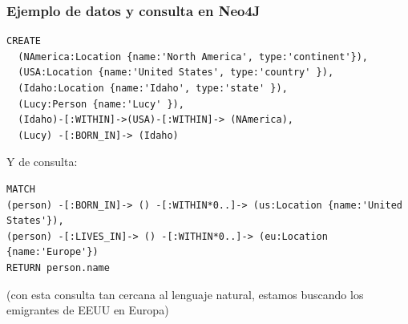 \documentclass[14pt]{beamer}
\begin{document}




\begin{frame}
  \frametitle{Ejemplo de datos y consulta en Neo4J}
\begin{block}{}
\begin{lstlisting}
CREATE
  (NAmerica:Location {name:'North America', type:'continent'}),
  (USA:Location {name:'United States', type:'country' }),
  (Idaho:Location {name:'Idaho', type:'state' }),
  (Lucy:Person {name:'Lucy' }),
  (Idaho)-[:WITHIN]->(USA)-[:WITHIN]-> (NAmerica),
  (Lucy) -[:BORN_IN]-> (Idaho)
\end{lstlisting}
\end{block}

\framebreak

Y de consulta:
\begin{block}{}
\begin{lstlisting}
MATCH
(person) -[:BORN_IN]-> () -[:WITHIN*0..]-> (us:Location {name:'United States'}),
(person) -[:LIVES_IN]-> () -[:WITHIN*0..]-> (eu:Location {name:'Europe'})
RETURN person.name
\end{lstlisting}
\end{block}

(con esta consulta tan cercana al lenguaje natural, estamos buscando los
emigrantes de EEUU en Europa)

\end{frame}


\end{document}
